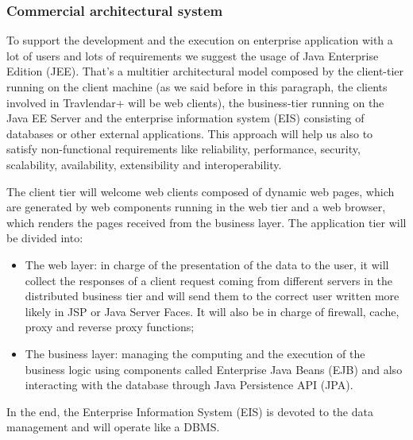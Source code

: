 \subsubsection{Commercial architectural system}
To support the development and the execution on enterprise application with a lot of users and lots of requirements we suggest the usage of Java Enterprise Edition (JEE).
That’s a multitier architectural model composed by the client-tier running on the client machine (as we said before in this paragraph, the clients involved in Travlendar+ will be web clients), the business-tier running on the Java EE Server and the enterprise information system (EIS) consisting of databases or other external applications.
This approach will help us also to satisfy non-functional requirements like reliability, performance, security, scalability, availability, extensibility and interoperability. 

The client tier will welcome web clients composed of dynamic web pages, which are generated by web components running in the web tier and a web browser, which renders the pages received
from the business layer.
The application tier will be divided into:
\begin{itemize}

\item	The web layer: in charge of the presentation of the data to the user, it will collect the responses of a client request coming from different servers in the distributed business tier and will send them to the correct user written more likely in JSP or Java Server Faces.
It will also be in charge of firewall, cache, proxy and reverse proxy functions;
\item	The business layer: managing the computing and the execution of the business logic using components called Enterprise Java Beans (EJB) and also interacting with the database through Java Persistence API (JPA).
\end{itemize}
In the end, the Enterprise Information System (EIS) is devoted to the data management and will operate like a DBMS.

